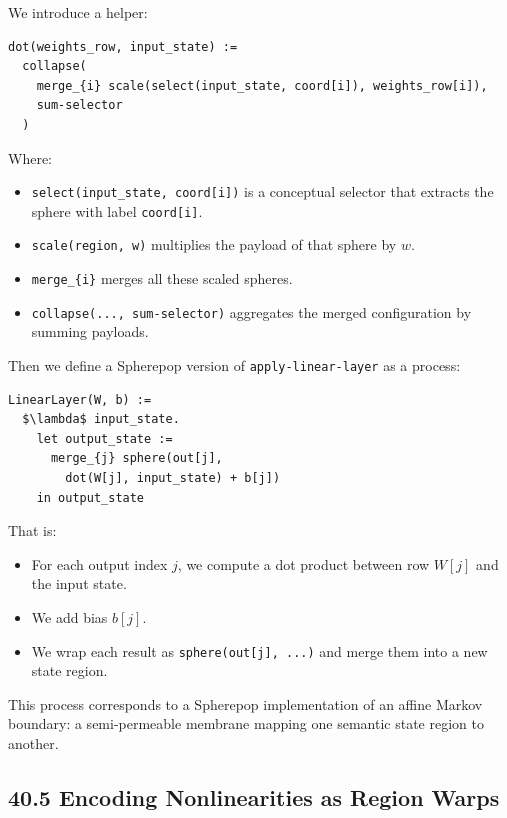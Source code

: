 \documentclass[12pt,letterpaper]{article}
\theoremstyle{remark}
\begin{document}
We introduce a helper:

\begin{verbatim}
dot(weights_row, input_state) :=
  collapse(
    merge_{i} scale(select(input_state, coord[i]), weights_row[i]),
    sum-selector
  )
\end{verbatim}

Where:

\begin{itemize}
  \item \verb|select(input_state, coord[i])| is a conceptual selector that extracts the sphere with label \verb|coord[i]|.
  \item \verb|scale(region, w)| multiplies the payload of that sphere by $w$.
  \item \verb|merge_{i}| merges all these scaled spheres.
  \item \verb|collapse(..., sum-selector)| aggregates the merged configuration by summing payloads.
\end{itemize}

Then we define a Spherepop version of \texttt{apply-linear-layer} as a process:

\begin{verbatim}
LinearLayer(W, b) :=
  $\lambda$ input_state.
    let output_state :=
      merge_{j} sphere(out[j],
        dot(W[j], input_state) + b[j])
    in output_state
\end{verbatim}

That is:

\begin{itemize}
  \item For each output index $j$, we compute a dot product between row $W[j]$ and the input state.
  \item We add bias $b[j]$.
  \item We wrap each result as \verb|sphere(out[j], ...)| and merge them into a new state region.
\end{itemize}

This process corresponds to a Spherepop implementation of an affine Markov boundary: a semi-permeable membrane mapping one semantic state region to another.

\subsection{40.5 Encoding Nonlinearities as Region Warps}
\end{document}
